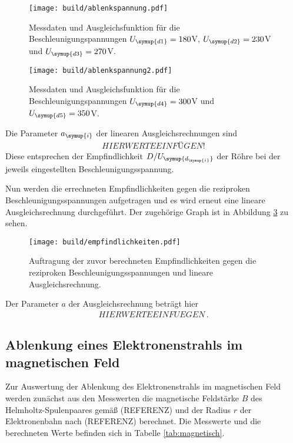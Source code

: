 \begin{figure}[h]
  \centering
  \texttt{[image: build/ablenkspannung.pdf]}
  \caption{Messdaten und Ausgleichsfunktion für die Beschleunigungspannungen
  $U_{\symup{d1}}=180$V, $U_{\symup{d2}}=230$V und $U_{\symup{d3}}=270$V.}
  \label{fig:ablenkspannung}
\end{figure}

\begin{figure}[h]
  \centering
  \texttt{[image: build/ablenkspannung2.pdf]}
  \caption{Messdaten und Ausgleichsfunktion für die Beschleunigungspannungen
  $U_{\symup{d4}}=300$V und $U_{\symup{d5}}=350$V.}
  \label{fig:ablenkspannung2}
\end{figure}

Die Parameter $a_{\symup{i}}$ der linearen Ausgleichsrechnungen sind
\begin{align*}
  HIER WERTE EINFÜGEN!
\end{align*}
Diese entsprechen der Empfindlichkeit $D/U_{\symup{d_{\symup{i}}}}$ der Röhre bei
der jeweils eingestellten Beschleunigungsspannung.

Nun werden die errechneten Empfindlichkeiten gegen die reziproken Beschleunigungsspannungen
aufgetragen und es wird erneut eine lineare Ausgleichsrechnung durchgeführt. Der
zugehörige Graph ist in Abbildung \ref{fig:empfindlichkeiten} zu sehen.

\begin{figure}[h]
  \centering
  \texttt{[image: build/empfindlichkeiten.pdf]}
  \caption{Auftragung der zuvor berechneten Empfindlichkeiten gegen die reziproken
  Beschleunigungsspannungen und lineare Ausgleichsrechnung.}
  \label{fig:empfindlichkeiten}
\end{figure}

Der Parameter $a$ der Ausgleichsrechnung beträgt hier
\begin{align*}
  HIER WERTE EINFUEGEN \,.
\end{align*}




\subsection{Ablenkung eines Elektronenstrahls im magnetischen Feld}
\label{subsec:bfeld}

Zur Auswertung der Ablenkung des Elektronenstrahls im magnetischen Feld werden
zunächst aus den Messwerten die magnetische Feldstärke $B$ des Helmholtz-Spulenpaares
gemäß (REFERENZ) und der Radius $r$ der Elektronenbahn nach (REFERENZ) berechnet. Die Messwerte und
die berechneten Werte befinden sich in Tabelle \ref{tab:magnetisch}.

